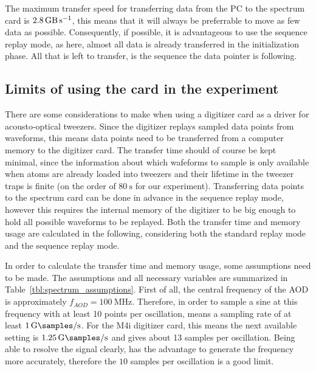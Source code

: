 The maximum transfer speed for transferring data from the PC to the spectrum card is $\SI{2.8}{\giga\byte\per\second}$, this means that it will always be preferrable to move as few data as possible. Consequently, if possible, it is advantageous to use the sequence replay mode, as here, almost all data is already transferred in the initialization phase. All that is left to transfer, is the sequence the data pointer is following.

\subsection{Limits of using the card in the experiment}

There are some considerations to make when using a digitizer card as a driver for acousto-optical tweezers. Since the digitizer replays sampled data points from waveforms, this means data points need to be transferred from a computer memory to the digitizer card. The transfer time should of course be kept minimal, since the information about which wafeforms to sample is only available when atoms are already loaded into tweezers and their lifetime in the tweezer traps is finite (on the order of $\SI{80}{\second}$ for our experiment). Transferring data points to the spectrum card can be done in advance in the sequence replay mode, however this requires the internal memory of the digitizer to be big enough to hold all possible waveforms to be replayed. Both the transfer time and memory usage are calculated in the following, considering both the standard replay mode and the sequence replay mode.

In order to calculate the transfer time and memory usage, some assumptions need to be made. The assumptions and all necessary variables are summarized in Table~\ref{tbl:spectrum_assumptions}. First of all, the central frequency of the AOD is approximately $f_{AOD} = \SI{100}{\mega\hertz}$. Therefore, in order to sample a sine at this frequency with at least 10 points per oscillation, means a sampling rate of at least $\SI{1}{\giga\samples\per\second}$. For the M4i digitizer card, this means the next available setting is $\SI{1.25}{\giga\samples\per\second}$ and gives about 13 samples per oscillation. Being able to resolve the signal clearly, has the advantage to generate the frequency more accurately, therefore the $10$ samples per oscillation is a good limit.

